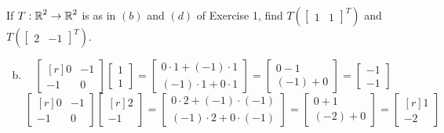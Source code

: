 \documentclass[../main.tex]{subfiles}
\begin{document}
If $T: \operatorname{\mathbb{R}}^2 \to \operatorname{\mathbb{R}}^2$ is as in $(b)$ and $(d)$ of Exercise 1, find $T\left(\begin{bmatrix}1&1\end{bmatrix}^T\right)$ and $T\left(\begin{bmatrix}2&-1\end{bmatrix}^T\right)$.

\solution
\begin{enumerate}[a)]
	\setcounter{enumi}{1}
	\item 
		\[
			\begin{bmatrix*}[r]0&-1\\-1&0\end{bmatrix*}
			\begin{bmatrix}1\\1\end{bmatrix}
			=
			\begin{bmatrix}
				0\cdot1 + (-1)\cdot1 \\
				(-1)\cdot1 + 0\cdot1
			\end{bmatrix}
			=
			\begin{bmatrix}
				0 - 1 \\
				(-1) + 0
			\end{bmatrix}
			=
			\begin{bmatrix}
				-1 \\
				-1
			\end{bmatrix}
		\]
		\[
			\begin{bmatrix*}[r]0&-1\\-1&0\end{bmatrix*}
			\begin{bmatrix*}[r]2\\-1\end{bmatrix*}
			=
			\begin{bmatrix}
				0\cdot2 + (-1)\cdot(-1) \\
				(-1)\cdot2 + 0\cdot(-1)
			\end{bmatrix}
			=
			\begin{bmatrix}
				0 + 1 \\
				(-2) + 0
			\end{bmatrix}
			=
			\begin{bmatrix*}[r]
				1 \\
				-2
			\end{bmatrix*}
\]
\end{enumerate}
\end{document}
